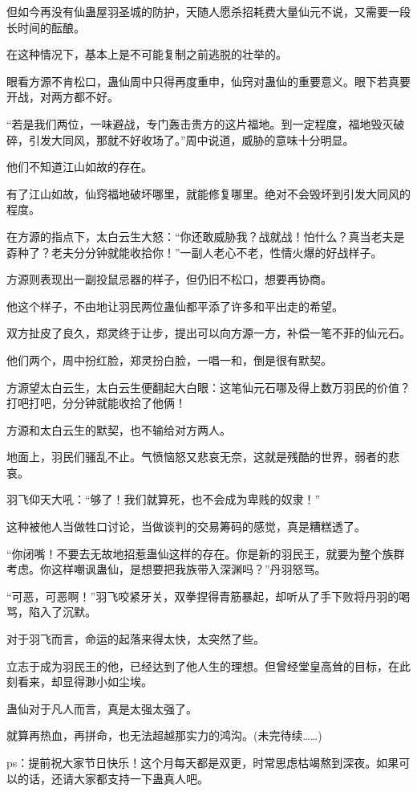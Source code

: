 \begin{this_body}
但如今再没有仙蛊屋羽圣城的防护，天随人愿杀招耗费大量仙元不说，又需要一段长时间的酝酿。

在这种情况下，基本上是不可能复制之前逃脱的壮举的。

眼看方源不肯松口，蛊仙周中只得再度重申，仙窍对蛊仙的重要意义。眼下若真要开战，对两方都不好。

“若是我们两位，一味避战，专门轰击贵方的这片福地。到一定程度，福地毁灭破碎，引发大同风，那就不好收场了。”周中说道，威胁的意味十分明显。

他们不知道江山如故的存在。

有了江山如故，仙窍福地破坏哪里，就能修复哪里。绝对不会毁坏到引发大同风的程度。

在方源的指点下，太白云生大怒：“你还敢威胁我？战就战！怕什么？真当老夫是孬种了？老夫分分钟就能收拾你！”一副人老心不老，性情火爆的好战样子。

方源则表现出一副投鼠忌器的样子，但仍旧不松口，想要再协商。

他这个样子，不由地让羽民两位蛊仙都平添了许多和平出走的希望。

双方扯皮了良久，郑灵终于让步，提出可以向方源一方，补偿一笔不菲的仙元石。

他们两个，周中扮红脸，郑灵扮白脸，一唱一和，倒是很有默契。

方源望太白云生，太白云生便翻起大白眼：这笔仙元石哪及得上数万羽民的价值？打吧打吧，分分钟就能收拾了他俩！

方源和太白云生的默契，也不输给对方两人。

地面上，羽民们骚乱不止。气愤恼怒又悲哀无奈，这就是残酷的世界，弱者的悲哀。

羽飞仰天大吼：“够了！我们就算死，也不会成为卑贱的奴隶！”

这种被他人当做牲口讨论，当做谈判的交易筹码的感觉，真是糟糕透了。

“你闭嘴！不要去无故地招惹蛊仙这样的存在。你是新的羽民王，就要为整个族群考虑。你这样嘲讽蛊仙，是想要把我族带入深渊吗？”丹羽怒骂。

“可恶，可恶啊！”羽飞咬紧牙关，双拳捏得青筋暴起，却听从了手下败将丹羽的喝骂，陷入了沉默。

对于羽飞而言，命运的起落来得太快，太突然了些。

立志于成为羽民王的他，已经达到了他人生的理想。但曾经堂皇高耸的目标，在此刻看来，却显得渺小如尘埃。

蛊仙对于凡人而言，真是太强太强了。

就算再热血，再拼命，也无法超越那实力的鸿沟。(未完待续……)

ps：提前祝大家节日快乐！这个月每天都是双更，时常思虑枯竭熬到深夜。如果可以的话，还请大家都支持一下蛊真人吧。

\end{this_body}

